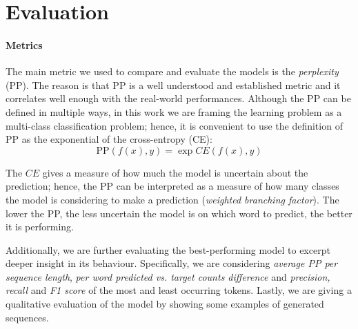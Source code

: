 
\section{Evaluation}
\paragraph*{Metrics}
The main metric we used to compare and evaluate the models is the \emph{perplexity} (PP). The reason is that PP is a well understood and established metric and it correlates well enough with the real-world performances. Although the PP can be defined in multiple ways, in this work we are framing the learning problem as a multi-class classification problem; hence, it is convenient to use the definition of PP as the exponential of the cross-entropy (CE):
\begin{equation}
    \text{PP}(f(x), y) = \exp{CE(f(x), y)}
\end{equation}

The $CE$ gives a measure of how much the model is uncertain about the prediction; hence, the PP can be interpreted as a measure of how many classes the model is considering to make a prediction (\emph{weighted branching factor}). The lower the PP, the less uncertain the model is on which word to predict, the better it is performing.

Additionally, we are further evaluating the best-performing model to excerpt deeper insight in its behaviour. Specifically, we are considering \emph{average PP per sequence length}, \emph{per word predicted vs. target counts difference} and \emph{precision, recall} and \emph{F1 score} of the most and least occurring tokens. Lastly, we are giving a qualitative evaluation of the model by showing some examples of generated sequences.